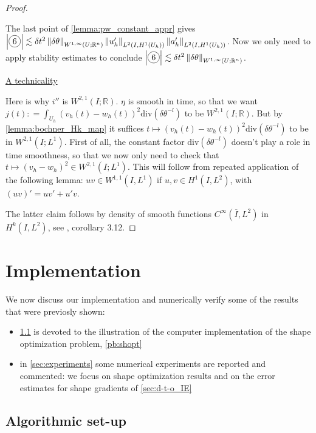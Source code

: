 \documentclass[english,a4paper,9pt,oneside]{scrbook}	%
\theoremstyle{break}
\newenvironment{mproof}[1][\proofname]{%
  \begin{proof}[#1]$ $\par\nobreak\ignorespaces
}{%
  \end{proof}
}
\renewcommand*{\proofname}{Proof}
\theoremstyle{remark}
\newcommand{\mR}{\mathbb{R}}
\newcommand{\norm}[1]{\left\lVert#1\right\rVert}
\newcommand{\te}{\theta}
\newcommand{\dive}{\text{div}}
\newcommand*\circled[1]{\tikz[baseline=(char.base)]{
            \node[shape=circle,draw,inner sep=2pt] (char) {#1};}}
\begin{document}
\begin{mproof}
The last point of \cref{lemma:pw_constant_appr} gives $\left | \circled{6} \right | \lesssim \delta t^2\norm{\delta \te}_{W^{1,\infty}(U;\mR^n)} \norm{u_h'}_{L^2(I,H^1(U_h))}\norm{a_h'}_{L^2(I,H^1(U_h))}$. Now we only need to apply stability estimates to conclude  $\left | \circled{6} \right | \lesssim \delta t^2 \norm{\delta \te}_{W^{1,\infty}(U;\mR^n)}$.

\underline{A technicality}

Here is why $i''$ is $W^{2,1}(I;\mR)$. $\eta$ is smooth in time, so that we want $j(t): = \int_{U_h}(v_h(t)-w_h(t))^2\dive(\delta \te^{-l})$ to be $W^{2,1}(I;\mR)$. But by \cref{lemma:bochner_Hk_map} it suffices $t \mapsto (v_h(t)-w_h(t))^2\dive(\delta \te^{-l})$ to be in $W^{2,1}(I;L^1)$. First of all, the constant factor $\dive(\delta \te^{-l})$ doesn't play a role in time smoothness, so that we now only need to check that $t \mapsto (v_h-w_h)^2\in W^{2,1}(I;L^1)$. This will follow from repeated application of the following lemma: $u v \in W^{1,1}(I,L^1)$ if $u,v \in H^1(I,L^2)$, with $(uv)' = uv'+u'v$.

The latter claim follows by density of smooth functions $C^{\infty}(\overline{I}, L^2)$ in $H^k(I,L^2)$, see \cite{kreuter}, corollary 3.12.

\end{mproof}

\chapter{Implementation}
\label{chap:num_exp}

We now discuss our implementation and numerically verify some of the results that were previosly shown:

\begin{itemize}
	\item \cref{sec:implementation} is devoted to the illustration of the computer implementation of the shape optimization problem, \cref{pb:shopt}
	\item in \cref{sec:experiments} some numerical experiments are reported and commented: we focus on shape optimization results and on the error estimates for shape gradients of \cref{sec:d-t-o_IE}
\end{itemize}

\section{Algorithmic set-up}
\label{sec:implementation}
\end{document}
